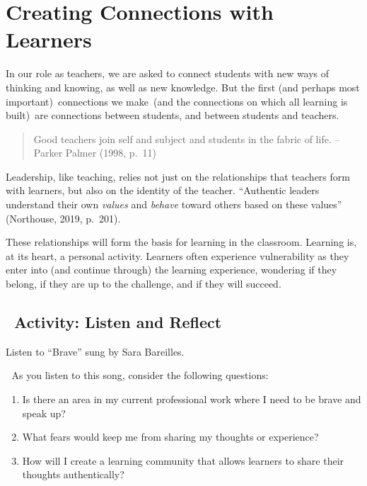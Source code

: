 \documentclass[
]{book}
\begin{document}
\hypertarget{creating-connections-with-learners}{%
\section{Creating Connections with Learners}\label{creating-connections-with-learners}}

In our role as teachers, we are asked to connect students with new ways of thinking and knowing, as well as new knowledge. But the first (and perhaps most important)~connections we make~(and the connections on which all learning is built)~are connections between students, and between students and teachers.

\begin{quote}
Good teachers join self and subject and students in the fabric of life. -- Parker Palmer (1998, p.~11)
\end{quote}

Leadership, like teaching, relies not just on the relationships that teachers form with learners, but also on the identity of the teacher. ``Authentic leaders understand their own \emph{values} and \emph{behave} toward others based on these values'' (Northouse, 2019, p.~201).

These relationships will form the basis for learning in the classroom. Learning is, at its heart, a personal activity. Learners often experience vulnerability as they enter into (and continue through) the learning experience, wondering if they belong, if they are up to the challenge, and if they will succeed.

\hypertarget{activity-listen-and-reflect}{%
\subsection{~Activity: Listen and Reflect}\label{activity-listen-and-reflect}}

\begin{video}
Listen to ``Brave'' sung by Sara Bareilles.

💭 As you listen to this song, consider the following questions:

\begin{enumerate}
\def\labelenumi{\arabic{enumi}.}
\item
  Is there an area in my current professional work where I need to be
  brave and speak up?
\item
  What fears would keep me from sharing my thoughts or experience?
\item
  How will I create a learning community that allows learners to share
  their thoughts authentically?
\end{enumerate}
\end{video}
\end{document}
